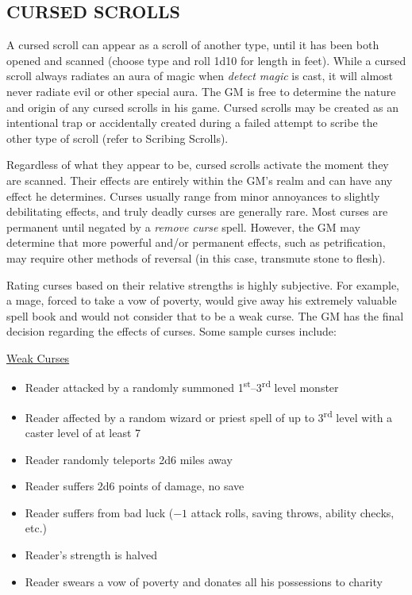 \begin{multicols}{2}
\subsection{CURSED SCROLLS}

A cursed scroll can appear as a scroll of another type, until it has been both opened and scanned (choose type and roll 1d10 for length in feet).  While a cursed scroll always radiates an aura of magic when \textit{detect magic} is cast, it will almost never radiate evil or other special aura.  The GM is free to determine the nature and origin of any cursed scrolls in his game.  Cursed scrolls may be created as an intentional trap or accidentally created during a failed attempt to scribe the other type of scroll (refer to Scribing Scrolls).

Regardless of what they appear to be, cursed scrolls activate the moment they are scanned.  Their effects are entirely within the GM's realm and can have any effect he determines.  Curses usually range from minor annoyances to slightly debilitating effects, and truly deadly curses are generally rare.  Most curses are permanent until negated by a \textit{remove curse} spell.  However, the GM may determine that more powerful and/or permanent effects, such as petrification, may require other methods of reversal (in this case, transmute stone to flesh).  

Rating curses based on their relative strengths is highly subjective.  For example, a mage, forced to take a vow of poverty, would give away his extremely valuable spell book and would not consider that to be a weak curse.  The GM has the final decision regarding the effects of curses.  Some sample curses include:

\noindent \underline{Weak Curses}

\begin{itemize}
\item Reader attacked by a randomly summoned 1\textsuperscript{st}--3\textsuperscript{rd} level monster
\item Reader affected by a random wizard or priest spell of up to 3\textsuperscript{rd} level with a caster level of at least 7
\item Reader randomly teleports 2d6 miles away
\item Reader suffers 2d6 points of damage, no save
\item Reader suffers from bad luck ($-1$ attack rolls, saving throws, ability checks, etc.)
\item Reader's strength is halved
\item Reader swears a vow of poverty and donates all his possessions to charity
\end{itemize}


\end{multicols}
